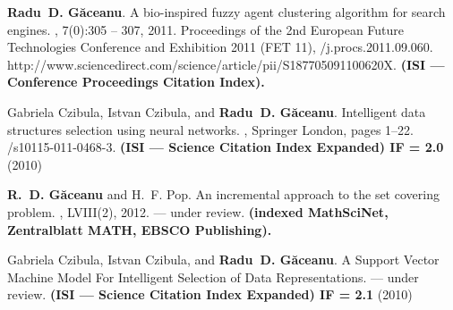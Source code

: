 \begin{thebibliography}{CDG07}
\textbf{Radu~D. G{\u{a}}ceanu}.
\newblock A bio-inspired fuzzy agent clustering algorithm for search engines.
, 7(0):305 -- 307, 2011.
\newblock Proceedings of the 2nd European Future Technologies Conference and
  Exhibition 2011 (FET 11),
/j.procs.2011.09.060.
\newblock http://www.sciencedirect.com/science/article/pii/S187705091100620X.  
\newblock \textbf{(ISI --- Conference Proceedings Citation Index).}
  
Gabriela Czibula, Istvan Czibula, and \textbf{Radu~D. G{\u{a}}ceanu}.
\newblock Intelligent data structures selection using neural networks.
, Springer London, pages 1--22.
/s10115-011-0468-3.  
\newblock \textbf{(ISI --- Science Citation Index Expanded) \color{red} IF = 2.0} \color{black} (2010)

\textbf{R.~D. G{\u{a}}ceanu} and H.~F. Pop.
\newblock An incremental approach to the set covering problem.
, LVIII(2),
  2012. --- under review.
\newblock \textbf{(indexed MathSciNet, Zentralblatt MATH, EBSCO Publishing).}

Gabriela Czibula, Istvan Czibula, and \textbf{Radu~D. G{\u{a}}ceanu}.
\newblock A Support Vector Machine Model For Intelligent Selection of Data Representations.
 --- under review.
\newblock \textbf{(ISI --- Science Citation Index Expanded) \color{red} IF = 2.1} \color{black} (2010)



  
  
\end{thebibliography}

